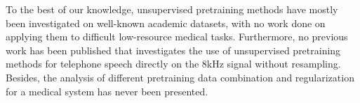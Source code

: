 To the best of our knowledge, unsupervised pretraining methods have mostly been investigated on well-known academic datasets, with no work done on applying them to difficult low-resource medical tasks. 
Furthermore, no previous work has been published that investigates the use of unsupervised pretraining methods for telephone speech directly on the 8kHz signal without resampling.
Besides, the analysis of different pretraining data combination and regularization for a medical  system has never been presented.

\pagebreak